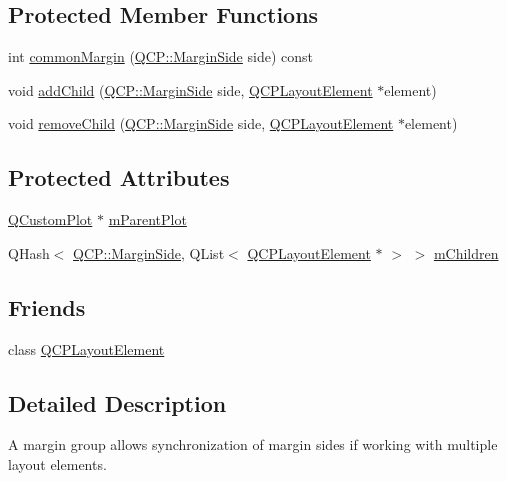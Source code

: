 \subsection*{Protected Member Functions}
\begin{DoxyCompactItemize}
\item 
int \hyperlink{class_q_c_p_margin_group_aeaeba9068dba2ef8be41449f0f2582f7}{common\+Margin} (\hyperlink{namespace_q_c_p_a7e487e3e2ccb62ab7771065bab7cae54}{Q\+C\+P\+::\+Margin\+Side} side) const 
\item 
void \hyperlink{class_q_c_p_margin_group_acb9c3a35acec655c2895b7eb95ee0524}{add\+Child} (\hyperlink{namespace_q_c_p_a7e487e3e2ccb62ab7771065bab7cae54}{Q\+C\+P\+::\+Margin\+Side} side, \hyperlink{class_q_c_p_layout_element}{Q\+C\+P\+Layout\+Element} $\ast$element)
\item 
void \hyperlink{class_q_c_p_margin_group_a20ab3286062957d99b58db683fe725b0}{remove\+Child} (\hyperlink{namespace_q_c_p_a7e487e3e2ccb62ab7771065bab7cae54}{Q\+C\+P\+::\+Margin\+Side} side, \hyperlink{class_q_c_p_layout_element}{Q\+C\+P\+Layout\+Element} $\ast$element)
\end{DoxyCompactItemize}
\subsection*{Protected Attributes}
\begin{DoxyCompactItemize}
\item 
\hyperlink{class_q_custom_plot}{Q\+Custom\+Plot} $\ast$ \hyperlink{class_q_c_p_margin_group_a23cfa29e3cc0f33a59141b77d8c04edf}{m\+Parent\+Plot}
\item 
Q\+Hash$<$ \hyperlink{namespace_q_c_p_a7e487e3e2ccb62ab7771065bab7cae54}{Q\+C\+P\+::\+Margin\+Side}, Q\+List$<$ \hyperlink{class_q_c_p_layout_element}{Q\+C\+P\+Layout\+Element} $\ast$ $>$ $>$ \hyperlink{class_q_c_p_margin_group_a954bc89ff8958b9bb6a4a0d08ed5fc0f}{m\+Children}
\end{DoxyCompactItemize}
\subsection*{Friends}
\begin{DoxyCompactItemize}
\item 
class \hyperlink{class_q_c_p_margin_group_a0790750c7e7f14fdbd960d172655b42b}{Q\+C\+P\+Layout\+Element}
\end{DoxyCompactItemize}


\subsection{Detailed Description}
A margin group allows synchronization of margin sides if working with multiple layout elements. 

